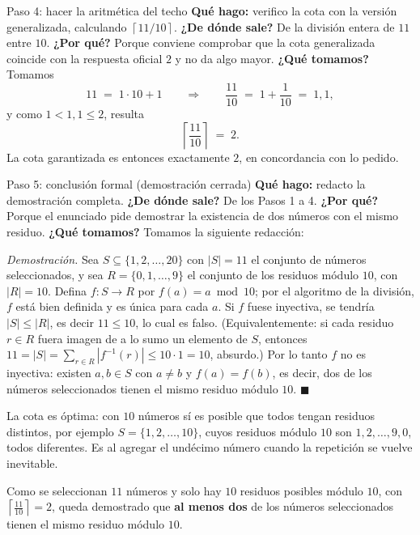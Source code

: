 \documentclass[11pt]{article}
\begin{document}
\begin{sol}
\begin{paso}{Paso 4: hacer la aritm\'etica del techo}
\textbf{Qu\'e hago:} verifico la cota con la versi\'on generalizada, calculando $\left\lceil 11/10\right\rceil$.
\textbf{¿De d\'onde sale?} De la divisi\'on entera de $11$ entre $10$.
\textbf{¿Por qu\'e?} Porque conviene comprobar que la cota generalizada coincide con la respuesta oficial $2$ y no da algo mayor.
\textbf{¿Qu\'e tomamos?} Tomamos
\[
11 \;=\; 1\cdot 10 + 1
\qquad\Longrightarrow\qquad
\frac{11}{10} \;=\; 1+\frac{1}{10} \;=\; 1{,}1 ,
\]
y como $1 < 1{,}1 \le 2$, resulta
\[
\left\lceil \frac{11}{10} \right\rceil \;=\; 2 .
\]
La cota garantizada es entonces exactamente $2$, en concordancia con lo pedido.
\end{paso}

\begin{paso}{Paso 5: conclusi\'on formal (demostraci\'on cerrada)}
\textbf{Qu\'e hago:} redacto la demostraci\'on completa.
\textbf{¿De d\'onde sale?} De los Pasos 1 a 4.
\textbf{¿Por qu\'e?} Porque el enunciado pide demostrar la existencia de dos n\'umeros con el mismo residuo.
\textbf{¿Qu\'e tomamos?} Tomamos la siguiente redacci\'on:

\medskip
\emph{Demostraci\'on.} Sea $S\subseteq\{1,2,\dots,20\}$ con $|S|=11$ el conjunto de n\'umeros seleccionados, y sea $R=\{0,1,\dots,9\}$ el conjunto de los residuos m\'odulo $10$, con $|R|=10$. Defina $f:S\to R$ por $f(a)=a\bmod 10$; por el algoritmo de la divisi\'on, $f$ est\'a bien definida y es \'unica para cada $a$. Si $f$ fuese inyectiva, se tendr\'ia $|S|\le |R|$, es decir $11\le 10$, lo cual es falso. (Equivalentemente: si cada residuo $r\in R$ fuera imagen de a lo sumo un elemento de $S$, entonces $11=|S|=\sum_{r\in R}|f^{-1}(r)| \le 10\cdot 1 = 10$, absurdo.) Por lo tanto $f$ no es inyectiva: existen $a,b\in S$ con $a\ne b$ y $f(a)=f(b)$, es decir, dos de los n\'umeros seleccionados tienen el mismo residuo m\'odulo $10$. $\blacksquare$
\end{paso}

\begin{nota}
La cota es \'optima: con $10$ n\'umeros s\'i es posible que todos tengan residuos distintos, por ejemplo $S=\{1,2,\dots,10\}$, cuyos residuos m\'odulo $10$ son $1,2,\dots,9,0$, todos diferentes. Es al agregar el und\'ecimo n\'umero cuando la repetici\'on se vuelve inevitable.
\end{nota}

\end{sol}

\begin{resp}
Como se seleccionan $11$ n\'umeros y solo hay $10$ residuos posibles m\'odulo $10$, con $\left\lceil \frac{11}{10}\right\rceil = 2$, queda demostrado que \textbf{al menos dos} de los n\'umeros seleccionados tienen el mismo residuo m\'odulo $10$.
\end{resp}
\end{document}
